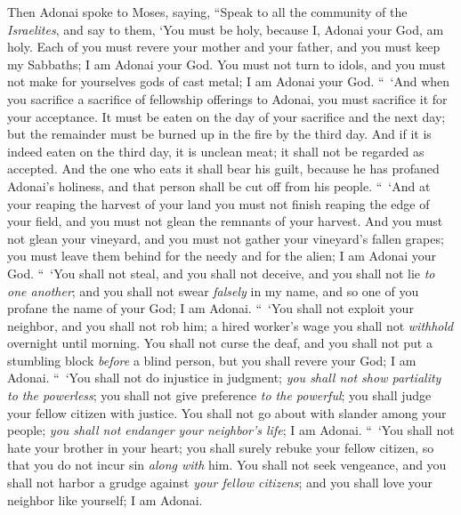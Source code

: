 \begin{biblechapter} %
 Then Adonai spoke to Moses, saying,
\verse “Speak to all the community of the \textit{Israelites}, and say to them, ‘You must be holy, because I, Adonai your God, am holy.
\verse Each of you must revere your mother and your father, and you must keep my Sabbaths; I am Adonai your God.
\verse You must not turn to idols, and you must not make for yourselves gods of cast metal; I am Adonai your God.
\verse “ ‘And when you sacrifice a sacrifice of fellowship offerings to Adonai, you must sacrifice it for your acceptance.
\verse It must be eaten on the day of your sacrifice and the next day; but the remainder must be burned up in the fire by the third day.
\verse And if it is indeed eaten on the third day, it is unclean meat; it shall not be regarded as accepted.
\verse And the one who eats it shall bear his guilt, because he has profaned Adonai’s holiness, and that person shall be cut off from his people.
 “ ‘And at your reaping the harvest of your land you must not finish reaping the edge of your field, and you must not glean the remnants of your harvest.
\verse And you must not glean your vineyard, and you must not gather your vineyard’s fallen grapes; you must leave them behind for the needy and for the alien; I am Adonai your God.
\verse “ ‘You shall not steal, and you shall not deceive, and you shall not lie \textit{to one another};
\verse and you shall not swear \textit{falsely} in my name, and so one of you profane the name of your God; I am Adonai.
\verse “ ‘You shall not exploit your neighbor, and you shall not rob him; a hired worker’s wage you shall not \textit{withhold} overnight until morning.
\verse You shall not curse the deaf, and you shall not put a stumbling block \textit{before} a blind person, but you shall revere your God; I am Adonai.
\verse “ ‘You shall not do injustice in judgment; \textit{you shall not show partiality to the powerless}; you shall not give preference \textit{to the powerful}; you shall judge your fellow citizen with justice.
\verse You shall not go about with slander among your people; \textit{you shall not endanger your neighbor’s life}; I am Adonai.
\verse “ ‘You shall not hate your brother in your heart; you shall surely rebuke your fellow citizen, so that you do not incur sin \textit{along with} him.
\verse You shall not seek vengeance, and you shall not harbor a grudge against \textit{your fellow citizens}; and you shall love your neighbor like yourself;  I am Adonai.

\end{biblechapter}
